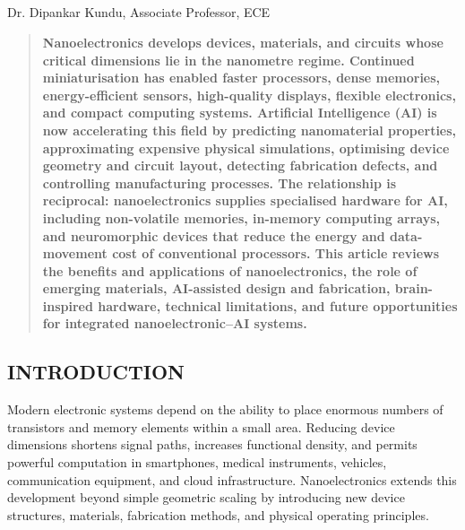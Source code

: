 \begin{center}
  \section{}
  Dr. Dipankar Kundu, Associate Professor, ECE
\end{center}

\setcounter{figure}{0}
\setcounter{table}{0}

\begin{multicols}{2}
  \begin{abstract}
    \bfseries
    Nanoelectronics develops devices, materials, and circuits whose critical dimensions lie in the nanometre regime. Continued miniaturisation has enabled faster processors, dense memories, energy-efficient sensors, high-quality displays, flexible electronics, and compact computing systems. Artificial Intelligence (AI) is now accelerating this field by predicting nanomaterial properties, approximating expensive physical simulations, optimising device geometry and circuit layout, detecting fabrication defects, and controlling manufacturing processes. The relationship is reciprocal: nanoelectronics supplies specialised hardware for AI, including non-volatile memories, in-memory computing arrays, and neuromorphic devices that reduce the energy and data-movement cost of conventional processors. This article reviews the benefits and applications of nanoelectronics, the role of emerging materials, AI-assisted design and fabrication, brain-inspired hardware, technical limitations, and future opportunities for integrated nanoelectronic--AI systems.
  \end{abstract}

  \subsection*{\centering\uppercase{Introduction}}
  Modern electronic systems depend on the ability to place enormous numbers of transistors and memory elements within a small area. Reducing device dimensions shortens signal paths, increases functional density, and permits powerful computation in smartphones, medical instruments, vehicles, communication equipment, and cloud infrastructure. Nanoelectronics extends this development beyond simple geometric scaling by introducing new device structures, materials, fabrication methods, and physical operating principles.


\end{multicols}
